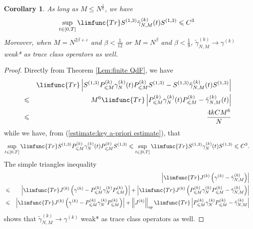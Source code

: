 \documentclass[12pt,letterpaper,leqno]{amsart}
\theoremstyle{plain}
\newtheorem{corollary}{Corollary}
\numberwithin{equation}{section}
\numberwithin{theorem}{section}
\numberwithin{proposition}{section}
\numberwithin{lemma}{section}
\numberwithin{corollary}{section}
\begin{document}
\begin{corollary}
\label{Corollary:Regularity for Tensor product finite qde}As long as $%
M\leqslant N^{\frac{1}{6}}$, we have 
\begin{equation*}
\sup_{t\in \left[ 0,T\right] }\limfunc{Tr}S^{(1,3)}\tilde{\gamma}%
_{N,M}^{(k)}(t)S^{(1,3)}\leqslant C^{3}
\end{equation*}%
Moreover, when $M=N^{2\beta +\varepsilon }$ and $\beta <\frac{1}{12}$ or $%
M=N^{\beta }$ and $\beta <\frac{1}{9}$, $\tilde{\gamma}_{N,M}^{(k)}%
\rightarrow \gamma ^{(k)}$ weak* as trace class operators as well.
\end{corollary}

\begin{proof}
Directly from Theorem \ref{Lem:finite QdF}, we have 
\begin{eqnarray*}
&&\limfunc{Tr}\left\vert S^{(1,3)}P_{\leqslant M}^{(k)}\gamma
_{N}^{(k)}(t)P_{\leqslant M}^{(k)}S^{(1,3)}-S^{(1,3)}\tilde{\gamma}%
_{N,M}^{(k)}(t)S^{(1,3)}\right\vert \\
&\leqslant &M^{6}\limfunc{Tr}\left\vert P_{\leqslant M}^{(k)}\gamma
_{N}^{(k)}(t)P_{\leqslant M}^{(k)}-\tilde{\gamma}_{N,M}^{(k)}(t)\right\vert
\\
&\leqslant &\frac{4kCM^{6}}{N}
\end{eqnarray*}%
while we have, from (\ref{estimate:key a-priori estimate}), that%
\begin{equation*}
\sup_{t\in \left[ 0,T\right] }\limfunc{Tr}S^{(1,3)}P_{\leqslant
M}^{(k)}\gamma _{N}^{(k)}(t)P_{\leqslant M}^{(k)}S^{(1,3)}\leqslant
\sup_{t\in \left[ 0,T\right] }\limfunc{Tr}S^{(1,3)}\gamma
_{N}^{(k)}(t)S^{(1,3)}\leqslant C^{3}.
\end{equation*}%
The simple triangles inequality%
\begin{eqnarray*}
&&\left\vert \limfunc{Tr}J^{(k)}\left( \gamma ^{(k)}-\tilde{\gamma}%
_{N,M}^{(k)}\right) \right\vert \\
&\leqslant &\left\vert \limfunc{Tr}J^{(k)}\left( \gamma ^{(k)}-P_{\leqslant
M}^{(k)}\gamma _{N}^{(k)}P_{\leqslant M}^{(k)}\right) \right\vert
+\left\vert \limfunc{Tr}J^{(k)}\left( P_{\leqslant M}^{(k)}\gamma
_{N}^{(k)}P_{\leqslant M}^{(k)}-\tilde{\gamma}_{N,M}^{(k)}\right) \right\vert
\\
&\leqslant &\left\vert \limfunc{Tr}J^{(k)}\left( \gamma ^{(k)}-P_{\leqslant
M}^{(k)}\gamma _{N}^{(k)}P_{\leqslant M}^{(k)}\right) \right\vert
+\left\Vert J^{(k)}\right\Vert _{op}\limfunc{Tr}\left\vert P_{\leqslant
M}^{(k)}\gamma _{N}^{(k)}P_{\leqslant M}^{(k)}-\tilde{\gamma}%
_{N,M}^{(k)}\right\vert
\end{eqnarray*}%
shows that $\tilde{\gamma}_{N,M}^{(k)}\rightarrow \gamma ^{(k)}$ weak* as
trace class operators as well.
\end{proof}
\end{document}

